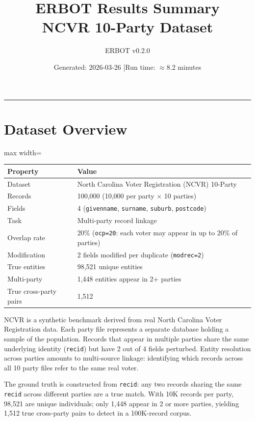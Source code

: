 \documentclass[11pt, a4paper]{article}
\title{\textbf{ERBOT Results Summary}\\[4pt]
       \large NCVR 10-Party Dataset}
\author{ERBOT v0.2.0}
\date{Generated: 2026-03-26 \quad|\quad Run time: $\approx$8.2 minutes}
\begin{document}
\maketitle
\tableofcontents
\vspace{1em}
\hrule
\vspace{1em}

\section{Dataset Overview}

\begin{table}[h!]
\centering
\begin{adjustbox}{max width=\linewidth}
\begin{tabular}{ll}
\toprule
\textbf{Property} & \textbf{Value} \\
\midrule
Dataset       & North Carolina Voter Registration (NCVR) 10-Party \\
Records       & 100,000 (10,000 per party $\times$ 10 parties) \\
Fields        & 4 (\texttt{givenname}, \texttt{surname}, \texttt{suburb}, \texttt{postcode}) \\
Task          & Multi-party record linkage \\
Overlap rate  & 20\% (\texttt{ocp=20}: each voter may appear in up to 20\% of parties) \\
Modification  & 2 fields modified per duplicate (\texttt{modrec=2}) \\
True entities & 98,521 unique entities \\
Multi-party   & 1,448 entities appear in 2+ parties \\
True cross-party pairs & 1,512 \\
\bottomrule
\end{tabular}
\end{adjustbox}
\end{table}

NCVR is a synthetic benchmark derived from real North Carolina Voter Registration
data. Each party file represents a separate database holding a sample of the
population. Records that appear in multiple parties share the same underlying
identity (\texttt{recid}) but have 2 out of 4 fields perturbed. Entity resolution
across parties amounts to multi-source linkage: identifying which records across
all 10 party files refer to the same real voter.

The ground truth is constructed from \texttt{recid}: any two records sharing the
same \texttt{recid} across different parties are a true match. With 10K records
per party, 98,521 are unique individuals; only 1,448 appear in 2 or more parties,
yielding 1,512 true cross-party pairs to detect in a 100K-record corpus.
\end{document}
